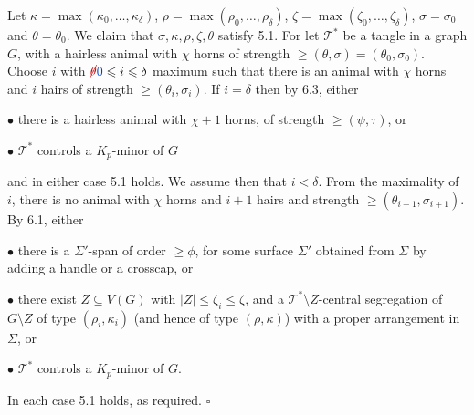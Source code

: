 Let $\kappa = \max(\kappa_0, \dots, \kappa_\delta)$, $\rho = \max(\rho_0, \dots, \rho_\delta)$, $\zeta = \max(\zeta_0, \dots, \zeta_\delta)$, $\sigma = \sigma_0$ and $\theta = \theta_0$. We claim that $\sigma, \kappa, \rho, \zeta, \theta$ satisfy 5.1. For let $\mathcal{T}^*$ be a tangle in a graph $G$, with a hairless animal with $\chi$ horns of strength $\ge (\theta, \sigma) = (\theta_0, \sigma_0)$. Choose $i$ with $\delm{\theta}\fix{0} \le i \le \delta$ maximum such that there is an animal with $\chi$ horns and $i$ hairs of strength $\ge (\theta_i, \sigma_i)$. If $i = \delta$ then by 6.3, either

\hspace*{12pt}$\bullet$ there is a hairless animal with $\chi + 1$ horns, of strength $\ge (\psi, \tau)$, or

\hspace*{12pt}$\bullet$ $\mathcal{T}^*$ controls a $K_p$-minor of $G$

and in either case 5.1 holds. We assume then that $i < \delta$. From the maximality of $i$, there is no animal with $\chi$ horns and $i + 1$ hairs and strength $\ge (\theta_{i+1}, \sigma_{i+1})$. By 6.1, either

\hspace*{12pt}$\bullet$ there is a $\Sigma'$-span of order $\ge \phi$, for some surface $\Sigma'$ obtained from $\Sigma$ by adding a handle or a crosscap, or

\hspace*{12pt}$\bullet$ there exist $Z \subseteq V(G)$ with $|Z| \le \zeta_i \le \zeta$, and a $\mathcal{T}^*\setminus Z$-central segregation of $G\setminus Z$ of type $(\rho_i, \kappa_i)$ (and hence of type $(\rho, \kappa)$) with a proper arrangement in $\Sigma$, or

\hspace*{12pt}$\bullet$ $\mathcal{T}^*$ controls a $K_p$-minor of $G$.

In each case 5.1 holds, as required. $\square$
